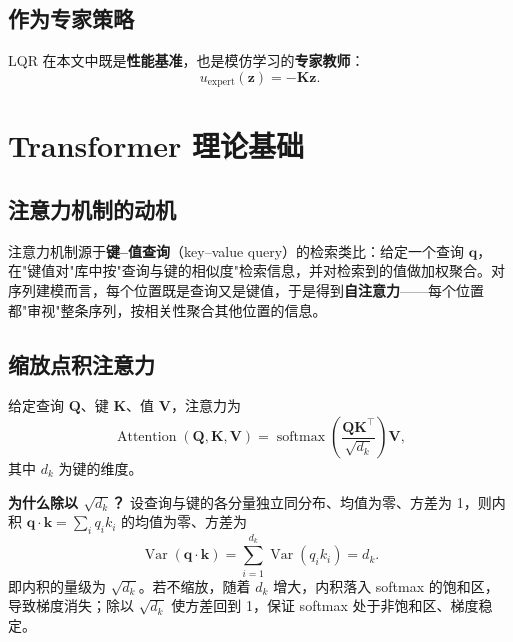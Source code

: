 \documentclass[11pt,a4paper]{article}
\begin{document}
\subsection{作为专家策略}

LQR 在本文中既是\textbf{性能基准}，也是模仿学习的\textbf{专家教师}：
\begin{equation}
    u_{\mathrm{expert}}(\mathbf z) = -\mathbf K\mathbf z .
\end{equation}

\section{Transformer 理论基础}

\subsection{注意力机制的动机}

注意力机制源于\textbf{键--值查询}（key--value query）的检索类比：给定一个查询 $\mathbf q$，在"键值对"库中按"查询与键的相似度"检索信息，并对检索到的值做加权聚合。对序列建模而言，每个位置既是查询又是键值，于是得到\textbf{自注意力}——每个位置都"审视"整条序列，按相关性聚合其他位置的信息。

\subsection{缩放点积注意力}

给定查询 $\mathbf Q$、键 $\mathbf K$、值 $\mathbf V$，注意力为
\begin{equation}
    \operatorname{Attention}(\mathbf Q, \mathbf K, \mathbf V)
    = \operatorname{softmax}\!\left(\frac{\mathbf Q \mathbf K^{\top}}{\sqrt{d_k}}\right)\mathbf V ,
    \label{eq:attention}
\end{equation}
其中 $d_k$ 为键的维度。

\textbf{为什么除以 $\sqrt{d_k}$？} 设查询与键的各分量独立同分布、均值为零、方差为 1，则内积 $\mathbf q\cdot\mathbf k = \sum_i q_i k_i$ 的均值为零、方差为
\begin{equation}
    \operatorname{Var}(\mathbf q\cdot\mathbf k) = \sum_{i=1}^{d_k} \operatorname{Var}(q_i k_i) = d_k .
\end{equation}
即内积的量级为 $\sqrt{d_k}$。若不缩放，随着 $d_k$ 增大，内积落入 softmax 的饱和区，导致梯度消失；除以 $\sqrt{d_k}$ 使方差回到 1，保证 softmax 处于非饱和区、梯度稳定。
\end{document}
